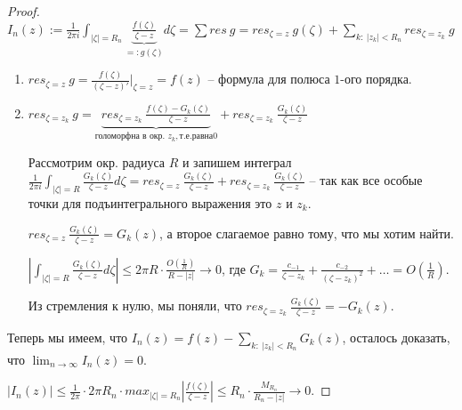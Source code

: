 \begin{proof}
    $I_n(z) := \frac{1}{2\pi i}\int_{|\zeta| = R_n} {\underbrace{\frac{f(\zeta)}{\zeta - z}}_{=: g(\zeta)} d\zeta} = \sum res \ g = res_{\zeta = z} \ g(\zeta) + \sum_{k : \ |z_k| < R_n} res_{\zeta = z_k} \ g$

    \begin{enumerate}
        \item {
            $res_{\zeta = z} \ g = \frac{f(\zeta)}{(\zeta - z)'}|_{\zeta = z} = f(z)$ -- формула для полюса $1$-ого порядка.
        }
        \item {
            $res_{\zeta = z_k} \ g = \underbrace{res_{\zeta = z_k} \ \frac{f(\zeta) - G_k(\zeta)}{\zeta - z}}_{\text{голоморфна в окр. } z_k, т.е. равна 0} + res_{\zeta = z_k} \ \frac{G_k(\zeta)}{\zeta - z}$

            Рассмотрим окр. радиуса $R$ и запишем интеграл $\frac{1}{2 \pi i} \int_{|\zeta| = R} {\frac{G_k(\zeta)}{\zeta - z} d\zeta} = res_{\zeta = z} \ \frac{G_k(\zeta)}{\zeta - z} + res_{\zeta = z_k} \ \frac{G_k(\zeta)}{\zeta - z}$ -- так как все особые точки для подъинтегрального выражения это $z$ и $z_k$.


            $res_{\zeta = z} \ \frac{G_k(\zeta)}{\zeta - z} = G_k(z)$, а второе слагаемое равно тому, что мы хотим найти.

            $\left| \int_{|\zeta| = R} {\frac{G_k(\zeta)}{\zeta - z} d\zeta} \right| \leq 2\pi R \cdot \frac{O\left(\frac{1}{R}\right)}{R - |z|} \rightarrow 0$, где $G_k = \frac{c_{-1}}{\zeta - z_k} + \frac{c_{-2}}{(\zeta - z_k)^2} + \ldots = O(\frac{1}{R})$.

            Из стремления к нулю, мы поняли, что $res_{\zeta = z_k} \ \frac{G_k(\zeta)}{\zeta - z} = -G_k(z)$.
        }
    \end{enumerate}

    
    Теперь мы имеем, что $I_n(z) = f(z) - \sum_{k: \ |z_k| < R_n} G_k(z)$, осталось доказать, что $\lim_{n \rightarrow \infty} I_n(z) = 0$.

    $\left| I_n(z) \right| \leq \frac{1}{2 \pi} \cdot 2\pi R_n \cdot max_{|\zeta| = R_n} \left| \frac{f(\zeta)}{\zeta - z} \right| \leq R_n \cdot \frac{M_{R_n}}{R_n - |z|} \rightarrow 0$.




\end{proof}
